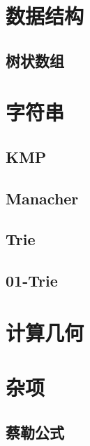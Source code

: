 \documentclass{article}
\begin{document}
\section{数据结构}
\subsection{树状数组}

\section{字符串}
\subsection{KMP}

\subsection{Manacher}

\subsection{Trie}
\subsection{01-Trie}

\section{计算几何}

\section{杂项}
\subsection{蔡勒公式}
\end{document}
